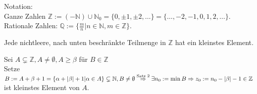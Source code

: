 \documentclass[../ana1.tex]{subfiles}
\begin{document}
Notation:\\
Ganze Zahlen $\mathbb{Z} := (-\mathbb{N})\cup \mathbb{N}_0 = \{0, \pm 1, \pm 2, \ldots\} = \{\ldots, -2,-1,0,1,2,\ldots\}$.\\
Rationale Zahlen: $\mathbb{Q} := \{ \frac{m}{n} \vert n\in\mathbb{N}, m\in\mathbb{Z}\}$.
\begin{kor}
	Jede nichtleere, nach unten beschränkte Teilmenge in $\mathbb{Z}$ hat ein kleinstes Element.
\end{kor}
\begin{bew}
	Sei $A\subsetneq \mathbb{Z}, A\neq \emptyset, A\geq \beta$ für $B\in\mathbb{Z}$\\
	Setze $B:= A+\beta +1 =\{\alpha+|\beta|+1\vert \alpha\in A\}\subsetneq \mathbb{N}, B\neq \emptyset\\
		\overset{\text{Satz 2}}{\Rightarrow} \exists n_0:= \min B \Rightarrow z_0 := n_0 - |\beta|-1\in\mathbb{Z}$ ist kleinstes Element von $A$.
\end{bew}
\end{document}
